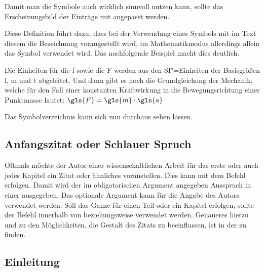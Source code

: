 \documentclass[%
  english,ngerman,%
  geometry=no,DIV=12,automark,%
]{tudscrartcl}
\begin{document}
Damit man die Symbole auch wirklich sinnvoll nutzen kann, sollte das 
Erscheinungsbild der Einträge mit  angepasst werden.
%
\begin{Tutorial}
\end{Tutorial}
%
Diese Definition führt dazu, dass bei der Verwendung eines Symbols mit
 im Text diesem die Bezeichnung vorangestellt 
wird, im Mathematikmodus allerdings allein das Symbol verwendet wird. Das 
nachfolgende Beispiel macht dies deutlich.
%
\begin{Tutorial}
Die Einheiten für die \gls{f} sowie die \gls{F} werden aus den
SI"=Einheiten der Basisgrößen \gls{l}, \gls{m} und \gls{t} abgeleitet.
Und dann gibt es noch die Grundgleichung der Mechanik, welche für den
Fall einer konstanten Kraftwirkung in die Bewegungsrichtung einer
Punktmasse lautet:
$\gls{F} = \gls{m} \cdot \gls{a}$
\end{Tutorial}
%
Das Symbolverzeichnis kann sich nun durchaus sehen lassen.
%
\begin{Tutorial*}
\printsymbols[style=symbolslongtabu]
\end{Tutorial*}
\begin{quoting}[rightmargin=0pt]
\printsymbols[style=symbolstabu]
\end{quoting}


\section{Anfangszitat oder Schlauer Spruch}
\bigskip\noindent
Oftmals möchte der Autor einer wissenschaftlichen Arbeit für das erste oder 
auch jedes Kapitel ein Zitat oder ähnliches voranstellen. Dies kann mit dem 
Befehl  erfolgen. Damit wird 
der im obligatorischen Argument angegeben Ausspruch in einer  
ausgegeben. Das optionale Argument kann für die Angabe des Autors verwendet 
werden. Soll das Ganze für einen Teil oder ein Kapitel erfolgen, sollte der 
Befehl  innerhalb von  beziehungsweise 
 verwendet werden. Genaueres hierzu und zu den 
Möglichkeiten, die Gestalt des Zitats zu beeinflussen, ist in der \scrguide zu 
finden.
\begin{Tutorial*}
\chapter{Einleitung}
\end{Tutorial*}
\end{document}
